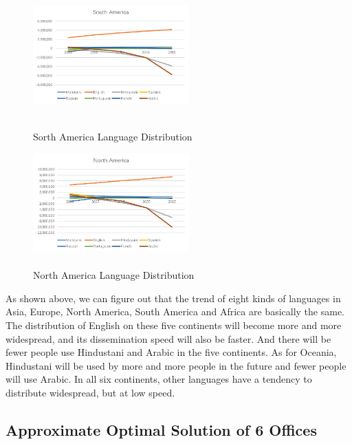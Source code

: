 \documentclass{mcmthesis}
\begin{document}
    \begin{figure}[h]
      \begin{minipage}[t]{0.5\linewidth}
      \centering
      \includegraphics[height=3.8cm,width=6cm]{A05.png}%
      \caption{\\Sorth America Language Distribution}
      \label{p12}
      \end{minipage}
      \begin{minipage}[t]{0.5\linewidth}
      \centering
      \includegraphics[height=3.8cm,width=6cm]{A06.png}%
      \caption{\\North America Language Distribution}
      \label{p13}
      \end{minipage}
    \end{figure}

    As shown above, we can figure out that the trend of eight kinds of languages in Asia, Europe, North America, South America and Africa are basically the same.
    The distribution of English on these five continents will become more and more widespread, and its dissemination speed will also be faster.
    And there will be fewer people use Hindustani and Arabic in the five continents.
    As for Oceania, Hindustani will be used by more and more people in the future and fewer people will use Arabic.
    In all six continents, other languages have a tendency to distribute widespread, but at low speed.



    \subsection{Approximate Optimal Solution of 6 Offices}%
\end{document}
